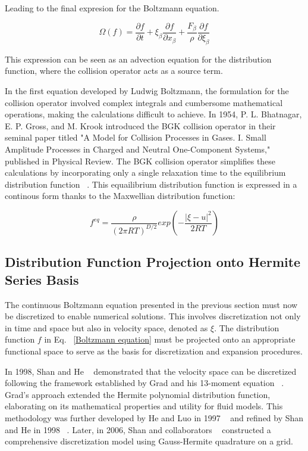 Leading to the final expresion for the Boltzmann equation.

\begin{equation}
	\Omega(f) = \frac{\partial f}{\partial t} 
	+ \xi_{\beta}\frac{\partial f}{\partial x_{\beta}}
	+ \frac{F_{\beta}}{\rho}\frac{\partial f}{\partial \xi_{\beta}}
	\label{Boltzmann equation}
\end{equation}

This expression can be seen as an advection equation for the distribution
function, where the collision operator acts as a source term.

In the first equation developed by Ludwig Boltzmann, the formulation for the
collision operator involved complex integrals and cumbersome mathematical
operations, making the calculations difficult to achieve. In 1954, P. L.
Bhatnagar, E. P. Gross, and M. Krook introduced the BGK collision operator in
their seminal paper titled "A Model for Collision Processes in Gases. I. Small
Amplitude Processes in Charged and Neutral One-Component Systems," published in
Physical Review. The BGK collision operator simplifies these calculations by
incorporating only a single relaxation time to the equilibrium distribution
function ~\cite{bhatnagar1954model}. This equailibrium distribution function is
expressed in a continous form thanks to the Maxwellian distribution function:

\begin{equation}
	f^{eq} = \frac{\rho}{(2\pi RT)^{D/2}}exp\left(-\frac{|\xi - u|^2}{2RT}\right)
\end{equation}


\subsection{Distribution Function Projection onto Hermite Series Basis}

The continuous Boltzmann equation presented in the previous section must now be
discretized to enable numerical solutions. This involves discretization not only
in time and space but also in velocity space, denoted as $\xi$. The distribution
function $f$ in Eq. ~\ref{Boltzmann equation} must be projected onto an
appropriate functional space to serve as the basis for discretization and
expansion procedures.

In 1998, Shan and He ~\cite{shan1998discretization} demonstrated that the
velocity space can be discretized following the framework established by Grad
and his 13-moment equation ~\cite{grad1949note}. Grad's approach extended the
Hermite polynomial distribution function, elaborating on its mathematical
properties and utility for fluid models. This methodology was further developed
by He and Luo in 1997 ~\cite{he1997theory} and refined by Shan and He in 1998
~\cite{shan1998discretization}. Later, in 2006, Shan and collaborators
~\cite{shan2006kinetic} constructed a comprehensive discretization model using
Gauss-Hermite quadrature on a grid.

